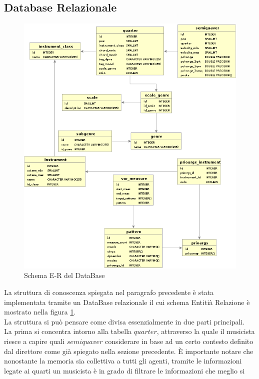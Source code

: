 \subsection{Database Relazionale}
\label{database}
\begin{figure}[H]
\centering
\includegraphics[scale=0.7]{img/db.png}
\caption{Schema E-R del DataBase}
\label{figure-db}
\end{figure}
La struttura di conoscenza spiegata nel paragrafo precedente è stata implementata
tramite un DataBase relazionale il cui schema Entitià Relazione è mostrato nella figura
\ref{figure-db}.\\
La struttura si può pensare come divisa essenzialmente in due parti principali.\\ 
La prima si concentra intorno alla tabella $quarter$, attraverso la quale il musicista
riesce a capire quali $semiquaver$ considerare in base ad un certo contesto definito
dal direttore come già spiegato nella sezione precedente. È importante notare che 
nonostante la memoria sia collettiva a tutti gli agenti, tramite le informazioni 
legate ai quarti un musicista è in grado di filtrare le informazioni che meglio si
